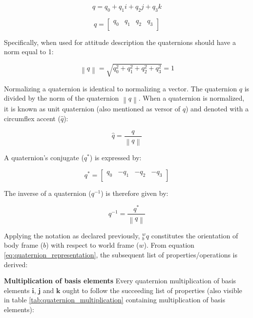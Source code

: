\begin{equation}
    q = q_0 + q_1 i + q_2 j + q_3 k
    \label{eq:quaternion_representation}
\end{equation}

\begin{equation}
    q =     \begin{bmatrix}
        q_0 & q_1 & q_2 & q_3 \\
    \end{bmatrix}
    \label{eq:quaternion_vector}
\end{equation}

Specifically, when used for attitude description the quaternions should have a norm equal to 1:

\begin{equation}
    \left\lVert q\right\rVert =\sqrt{q^2_0 + q^2_1 + q^2_2 + q^2_3} =1
\end{equation}

Normalizing a quaternion is identical to normalizing a vector. The quaternion $q$ is divided by the norm of the quaternion $\left\lVert q \right\rVert$. When a quaternion is normalized, it is known as unit quaternion (also mentioned as versor of $q$) and denoted with a circumflex accent ($\hat{q}$):

\begin{equation}
    \hat{q} = \frac{q}{\left\lVert q \right\rVert }
\end{equation}


A quaternion's conjugate ($q^{\ast} $) is expressed by:

\begin{equation}
    q^{\ast}  =\begin{bmatrix}
        q_0 & -q_1 & -q_2 & -q_3 \\
    \end{bmatrix}
\end{equation}

The inverse of a quaternion (${q^{-1}}$) is therefore given by:

\begin{equation}
    q^{-1} = \frac{q^{\ast} }{\left\lVert q \right\rVert }
\end{equation}

Applying the notation as declared previously, ${^w_b}q$ constitutes the orientation of body frame ($b$) with respect to world frame ($w$). From equation \ref{eq:quaternion_representation}, the subsequent list of properties/operations is derived:

\item \textbf{Multiplication of basis elements} Every quaternion multiplication of basis elements $\boldsymbol{i}$, $\boldsymbol{j}$ and $\boldsymbol{k}$ ought to follow the succeeding list of properties (also visible in table \ref{tab:quaternion_multiplication} containing multiplication of basis elements):


